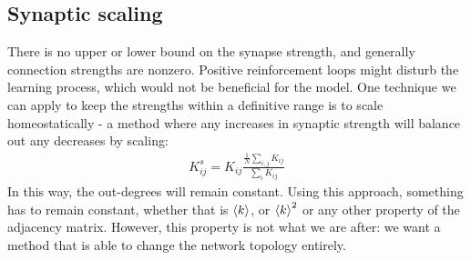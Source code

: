 \subsection{Synaptic scaling}
There is no upper or lower bound on the synapse strength, and generally connection strengths are nonzero. Positive reinforcement loops might disturb the learning process, which would not be beneficial for the model. One technique we can apply to keep the strengths within a definitive range is to scale homeostatically - a method where any increases in synaptic strength will balance out any decreases by scaling:
\begin{align}
K_{ij}^s = K_{ij} \frac{\frac{1}{N} \sum_{i,j} K_{ij}}{\sum_{i} K_{ij}}
\end{align}
In this way, the out-degrees will remain constant. Using this approach, something has to remain constant, whether that is ${\langle k\rangle}$, or ${\langle k\rangle}^2$ or any other property of the adjacency matrix. However, this property is not what we are after: we want a method that is able to change the network topology entirely.


